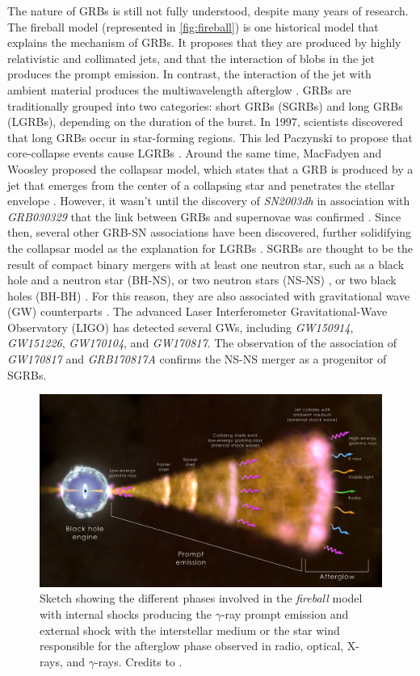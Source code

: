 The nature of GRBs is still not fully understood, despite many years of research. The fireball model (represented in \autoref{fig:fireball}) is one historical model that explains the mechanism of GRBs. It proposes that they are produced by highly relativistic and collimated jets, and that the interaction of blobs in the jet produces the prompt emission. In contrast, the interaction of the jet with ambient material produces the multiwavelength afterglow \cite{Bhat_2011}. GRBs are traditionally grouped into two categories: short GRBs (SGRBs) and long GRBs (LGRBs), depending on the duration of the burst. In 1997, scientists discovered that long GRBs occur in star-forming regions. This led Paczynski to propose that core-collapse events cause LGRBs \cite{paczynski_1998}. Around the same time, MacFadyen and Woosley proposed the collapsar model, which states that a GRB is produced by a jet that emerges from the center of a collapsing star and penetrates the stellar envelope \cite{macfadyen_woosley_1999}. However, it wasn't until the discovery of \textit{SN2003dh} in association with \textit{GRB030329} that the link between GRBs and supernovae was confirmed \cite{hjorth_et_al_2003}. Since then, several other GRB-SN associations have been discovered, further solidifying the collapsar model as the explanation for LGRBs \cite{bromberg2012observational}. SGRBs are thought to be the result of compact binary mergers with at least one neutron star, such as a black hole and a neutron star (BH-NS), or two neutron stars (NS-NS) \cite{cohen1995distribution}, or two black holes (BH-BH) \cite{Perna_2016}. For this reason, they are also associated with 
gravitational wave (GW) counterparts \cite{abbott_et_al_2017}. The advanced Laser Interferometer Gravitational-Wave Observatory (LIGO) has detected several GWs, including \textit{GW150914}, \textit{GW151226}, \textit{GW170104}, and \textit{GW170817}. The observation of the association of \textit{GW170817} and \textit{GRB170817A} \cite{abbott_et_al_2017} confirms the NS-NS merger as a progenitor of SGRBs.
 \begin{figure}[t]
\centering
\includegraphics[width=0.9\linewidth]{figures/introduction/grb_fireball.jpg}
\caption{Sketch showing the different phases involved in the \textit{fireball} model with internal shocks producing the $\gamma$-ray prompt emission and external shock with the interstellar medium or the star wind responsible
for the afterglow phase observed in radio, optical, X-rays, and $\gamma$-rays. Credits to \cite{fermiwebsite}.}
\label{fig:fireball}
\end{figure}


